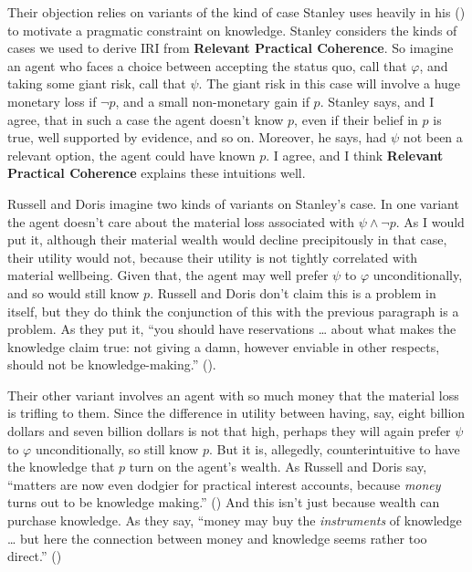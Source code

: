 \documentclass[
  11pt,
  letterpaper,
  DIV=11,
  numbers=noendperiod,
  oneside]{scrartcl}
\begin{document}
Their objection relies on variants of the kind of case Stanley uses
heavily in his () to motivate a
pragmatic constraint on knowledge. Stanley considers the kinds of cases
we used to derive IRI from \textbf{Relevant Practical Coherence}. So
imagine an agent who faces a choice between accepting the status quo,
call that \(\varphi\), and taking some giant risk, call that \(\psi\).
The giant risk in this case will involve a huge monetary loss if
\(\neg p\), and a small non-monetary gain if \(p\). Stanley says, and I
agree, that in such a case the agent doesn't know \(p\), even if their
belief in \(p\) is true, well supported by evidence, and so on.
Moreover, he says, had \(\psi\) not been a relevant option, the agent
could have known \(p\). I agree, and I think \textbf{Relevant Practical
Coherence} explains these intuitions well.

Russell and Doris imagine two kinds of variants on Stanley's case. In
one variant the agent doesn't care about the material loss associated
with \(\psi \wedge \neg p\). As I would put it, although their material
wealth would decline precipitously in that case, their utility would
not, because their utility is not tightly correlated with material
wellbeing. Given that, the agent may well prefer \(\psi\) to \(\varphi\)
unconditionally, and so would still know \(p\). Russell and Doris don't
claim this is a problem in itself, but they do think the conjunction of
this with the previous paragraph is a problem. As they put it, ``you
should have reservations \ldots{} about what makes the knowledge claim
true: not giving a damn, however enviable in other respects, should not
be knowledge-making.'' ().

Their other variant involves an agent with so much money that the
material loss is trifling to them. Since the difference in utility
between having, say, eight billion dollars and seven billion dollars is
not that high, perhaps they will again prefer \(\psi\) to \(\varphi\)
unconditionally, so still know \(p\). But it is, allegedly,
counterintuitive to have the knowledge that \(p\) turn on the agent's
wealth. As Russell and Doris say, ``matters are now even dodgier for
practical interest accounts, because \emph{money} turns out to be
knowledge making.'' () And this isn't just because wealth can purchase knowledge.
As they say, ``money may buy the \emph{instruments} of knowledge
\ldots{} but here the connection between money and knowledge seems
rather too direct.'' ()
\end{document}
